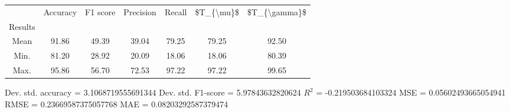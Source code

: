 \begin{tabular}{|c|c|c|c|c|c|c|}
\toprule
{} &  Accuracy &  F1 score &  Precision &  Recall &  \$T\_\{\textbackslash mu\}\$ &  \$T\_\{\textbackslash gamma\}\$ \\
Results &           &           &            &         &            &               \\
\hline
Mean    &     91.86 &     49.39 &      39.04 &   79.25 &      79.25 &         92.50 \\
Min.    &     81.20 &     28.92 &      20.09 &   18.06 &      18.06 &         80.39 \\
Max.    &     95.86 &     56.70 &      72.53 &   97.22 &      97.22 &         99.65 \\
\bottomrule
\end{tabular}

 Dev. std. accuracy = 3.1068719555691344
 Dev. std. F1-score = 5.97843632820624
 $R^2$ = -0.219503684103324
 MSE = 0.05602493665054941
 RMSE = 0.23669587375057768
 MAE = 0.08203292587379474